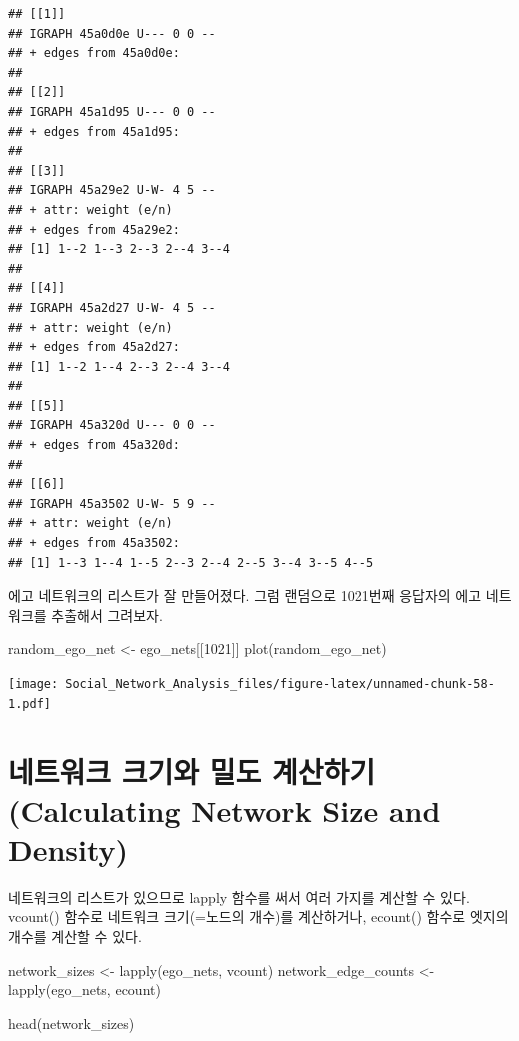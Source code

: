 \documentclass[
]{book}
\newenvironment{Shaded}{\begin{snugshade}}{\end{snugshade}}
\newcommand{\DecValTok}[1]{\textcolor[rgb]{0.00,0.00,0.81}{#1}}
\newcommand{\FunctionTok}[1]{\textcolor[rgb]{0.00,0.00,0.00}{#1}}
\newcommand{\NormalTok}[1]{#1}
\newcommand{\OtherTok}[1]{\textcolor[rgb]{0.56,0.35,0.01}{#1}}
\begin{document}
\begin{verbatim}
## [[1]]
## IGRAPH 45a0d0e U--- 0 0 -- 
## + edges from 45a0d0e:
## 
## [[2]]
## IGRAPH 45a1d95 U--- 0 0 -- 
## + edges from 45a1d95:
## 
## [[3]]
## IGRAPH 45a29e2 U-W- 4 5 -- 
## + attr: weight (e/n)
## + edges from 45a29e2:
## [1] 1--2 1--3 2--3 2--4 3--4
## 
## [[4]]
## IGRAPH 45a2d27 U-W- 4 5 -- 
## + attr: weight (e/n)
## + edges from 45a2d27:
## [1] 1--2 1--4 2--3 2--4 3--4
## 
## [[5]]
## IGRAPH 45a320d U--- 0 0 -- 
## + edges from 45a320d:
## 
## [[6]]
## IGRAPH 45a3502 U-W- 5 9 -- 
## + attr: weight (e/n)
## + edges from 45a3502:
## [1] 1--3 1--4 1--5 2--3 2--4 2--5 3--4 3--5 4--5
\end{verbatim}

에고 네트워크의 리스트가 잘 만들어졌다. 그럼 랜덤으로 1021번째 응답자의 에고 네트워크를 추출해서 그려보자.

\begin{Shaded}
\begin{Highlighting}[]
\NormalTok{random\_ego\_net }\OtherTok{\textless{}{-}}\NormalTok{ ego\_nets[[}\DecValTok{1021}\NormalTok{]]}
\FunctionTok{plot}\NormalTok{(random\_ego\_net)}
\end{Highlighting}
\end{Shaded}

\texttt{[image: Social\_Network\_Analysis\_files/figure-latex/unnamed-chunk-58-1.pdf]}

\hypertarget{uxb124uxd2b8uxc6ccuxd06c-uxd06cuxae30uxc640-uxbc00uxb3c4-uxacc4uxc0b0uxd558uxae30-calculating-network-size-and-density}{%
\section{네트워크 크기와 밀도 계산하기 (Calculating Network Size and Density)}\label{uxb124uxd2b8uxc6ccuxd06c-uxd06cuxae30uxc640-uxbc00uxb3c4-uxacc4uxc0b0uxd558uxae30-calculating-network-size-and-density}}

네트워크의 리스트가 있으므로 lapply 함수를 써서 여러 가지를 계산할 수 있다.
vcount() 함수로 네트워크 크기(=노드의 개수)를 계산하거나, ecount() 함수로 엣지의 개수를 계산할 수 있다.

\begin{Shaded}
\begin{Highlighting}[]
\NormalTok{network\_sizes }\OtherTok{\textless{}{-}} \FunctionTok{lapply}\NormalTok{(ego\_nets, vcount)}
\NormalTok{network\_edge\_counts }\OtherTok{\textless{}{-}} \FunctionTok{lapply}\NormalTok{(ego\_nets, ecount)}

\FunctionTok{head}\NormalTok{(network\_sizes)}
\end{Highlighting}
\end{Shaded}
\end{document}
